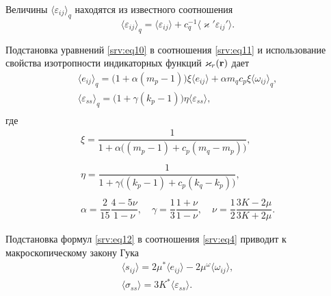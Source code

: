 Величины $ \langle  {\varepsilon_{ij}}  \rangle _{q}$  находятся из известного соотношения~\cite{Saraev2017}
\begin{equation}\label{srv:eq11}
 \langle  {\varepsilon_{ij}}  \rangle _{q}= \langle  {\varepsilon_{ij}}  \rangle +c_{q}^{-1} \langle  {\varkappa'\varepsilon_{ij}'}  \rangle .
\end{equation}

Подстановка уравнений \eqref{srv:eq10} в соотношения \eqref{srv:eq11} и использование свойства изотропности индикаторных функций $\varkappa_{r}(\bold{r})$ дает
\begin{equation}\label{srv:eq12}
\begin{array}{ll}
 \langle  {e_{ij}}  \rangle _{q}=\bigl(1+\alpha (m_{p}-1 )\bigr)\xi  \langle  {e_{ij}}  \rangle +\alpha m_{q}c_{p} \xi  \langle \omega_{ij} \rangle _{q},
\\[2mm]
 \langle  {\varepsilon_{ss}}  \rangle _{q}=\bigl(1+\gamma (k_{p}-1 )\bigr) \eta  \langle  {\varepsilon_{ss}}  \rangle ,\\
\end{array}
\end{equation}
где
\begin{equation}
\begin{array}{c}
\xi=\dfrac{1}{1+\alpha \bigl( (m_{p}-1 )+c_{p} (m_{q}-m_{p} )\bigr)},\\
\\[2mm]
\eta=\dfrac{1}{1+\gamma \bigl( (k_{p}-1 )+c_{p} (k_{q}-k_{p})\bigr)},\\
\\[2mm]
\alpha=\dfrac{2}{15}\dfrac{4-5\nu}{1-\nu},\quad  \gamma=\dfrac{1}{3} \dfrac{1+\nu}{1-\nu},\quad \nu=\dfrac{1}{2}\dfrac{3K-2\mu}{3K+2\mu}.
\end{array}
\end{equation}

Подстановка формул \eqref{srv:eq12} в соотношения \eqref{srv:eq4} приводит к макроскопическому закону Гука
\begin{equation}
\begin{array}{ll}
 \langle  {s_{ij}}  \rangle = 2 \mu^{*} \langle  {e_{ij}}  \rangle -2 \mu^{\omega}  \langle  {\omega_{ij}}  \rangle ,\\[2mm]
\big \langle {\sigma_{ss}} \big \rangle=3 K^{*} \langle  {\varepsilon_{ss}}  \rangle .
\end{array}
\end{equation}

